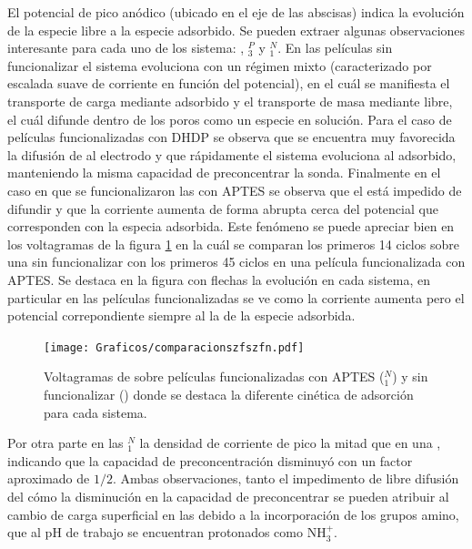	  	 El potencial de pico anódico (ubicado en el eje de las abscisas) indica la evolución de la especie \ru\space libre a la especie \ru\space adsorbido. Se pueden extraer algunas observaciones interesante para cada uno de los sistema: \pdmZ, \pdmZ$^P_3$ y \pdmZ$^N_1$. En las películas sin funcionalizar el sistema evoluciona con un régimen mixto (caracterizado por escalada suave de corriente en función del potencial), en el cuál se manifiesta el transporte de carga mediante \ru\space adsorbido y el transporte de masa mediante \ru\space libre, el cuál difunde dentro de los poros como un especie en solución. Para el caso de películas funcionalizadas con DHDP se observa que se encuentra muy favorecida la difusión de \ru\space al electrodo y que rápidamente el sistema evoluciona al adsorbido, manteniendo la misma capacidad de preconcentrar la sonda. Finalmente en el caso en que se funcionalizaron las \pdmZ\space con APTES se observa que el \ru\space está impedido de difundir y que la corriente aumenta de forma abrupta cerca del potencial que corresponden con la especia \ru\space adsorbida. Este fenómeno se puede apreciar bien en los voltagramas de la figura \ref{fig:compaptesnoaptes} en la cuál se comparan los primeros 14 ciclos sobre una \pdmZ\space sin funcionalizar con los primeros 45 ciclos en una película funcionalizada con APTES. Se destaca en la figura con flechas la evolución en cada sistema, en particular en las películas funcionalizadas se ve como la corriente aumenta pero el potencial correpondiente siempre al la de la especie adsorbida.

	 	 		 \begin{figure}[h!]	
					\centering
			 	    \texttt{[image: Graficos/comparacionszfszfn.pdf]}
			        \caption[Evolución de la señal de \ru\space para distintos sistemas]{Voltagramas de \ru\space sobre películas funcionalizadas con APTES (\pdmZ$^N_1$) y sin funcionalizar (\pdmZ) donde se destaca la diferente cinética de adsorción para cada sistema.}
			        \vspace*{4mm}
			        \label{fig:compaptesnoaptes}
			      	\end{figure}


	 	 Por otra parte en las \pdmZ$^N_1$ la densidad de corriente de pico la mitad que en una \pdmZ, indicando que la capacidad de preconcentración disminuyó con un factor aproximado de $1/2$. Ambas observaciones, tanto el impedimento de libre difusión del \ru\space cómo la disminución en la capacidad de preconcentrar se pueden atribuir al cambio de carga superficial en las \pdmZ\space debido a la incorporación de los grupos amino, que al pH de trabajo se encuentran protonados como NH$_3^+$.

